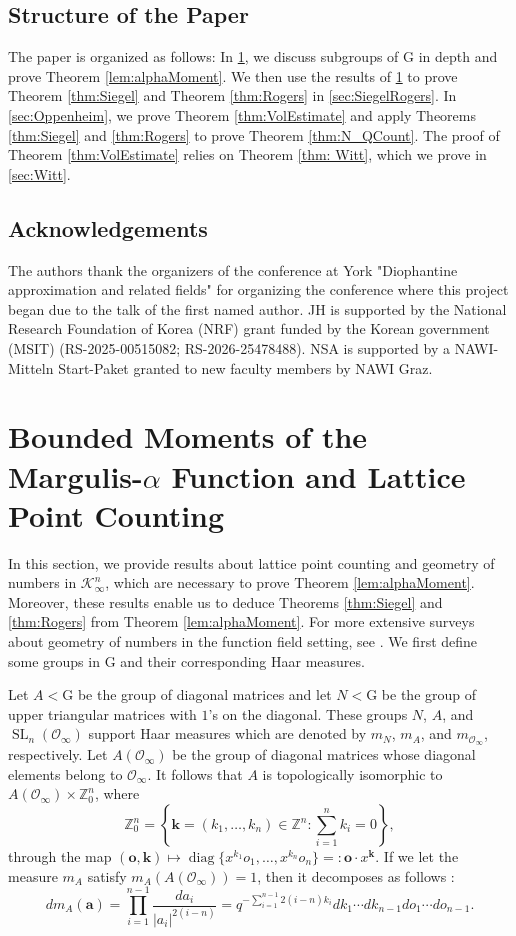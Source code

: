 \documentclass[11pt,a4paper,reqno]{amsart}
\theoremstyle{definition}
\theoremstyle{remark}
\numberwithin{equation}{section}
\begin{document}
\subsection{Structure of the Paper} The paper is organized as follows: In \cref{sec:GON}, we discuss subgroups of $\mathrm{G}$ in depth and prove Theorem \ref{lem:alphaMoment}. We then use the results of \cref{sec:GON} to prove Theorem \ref{thm:Siegel} and Theorem \ref{thm:Rogers} in \cref{sec:SiegelRogers}. In \cref{sec:Oppenheim}, we prove Theorem \ref{thm:VolEstimate} and apply Theorems \ref{thm:Siegel} and \ref{thm:Rogers} to prove Theorem \ref{thm:N_QCount}. The proof of Theorem \ref{thm:VolEstimate} relies on Theorem \ref{thm: Witt}, which we prove in \cref{sec:Witt}. 
\subsection{Acknowledgements}
The authors thank the organizers of the conference at York "Diophantine approximation and related fields" for organizing the conference where this project began due to the talk of the first named author. JH is supported by the National Research Foundation of Korea (NRF) grant funded by the Korean government (MSIT) (RS-2025-00515082; RS-2026-25478488). NSA is supported by a NAWI-Mitteln Start-Paket granted to new faculty members by NAWI Graz. 
\section{Bounded Moments of the Margulis-$\alpha$ Function and Lattice Point Counting}
\label{sec:GON}
In this section, we provide results about lattice point counting and geometry of numbers in $\mathcal{K}_{\infty}^n$, which are necessary to prove Theorem \ref{lem:alphaMoment}. Moreover, these results enable us to deduce Theorems \ref{thm:Siegel} and \ref{thm:Rogers} from Theorem \ref{lem:alphaMoment}. For more extensive surveys about geometry of numbers in the function field setting, see \cite{Mah,BT,Weil,RW,KST,A}. We first define some groups in $\mathrm{G}$ and their corresponding Haar measures.

Let $A<\mathrm{G}$ be the group of diagonal matrices and let $N<\mathrm{G}$ be the group of upper triangular matrices with $1$'s on the diagonal. These groups $N$, $A$, and $\operatorname{SL}_n(\mathcal{O}_{\infty})$ support Haar measures which are denoted by $m_N$, $m_A$, and $m_{\mathcal{O}_{\infty}}$, respectively. Let $A(\mathcal{O}_{\infty})$ be the group of diagonal matrices whose diagonal elements belong to $\mathcal{O}_{\infty}$. It follows that $A$ is topologically isomorphic to $A(\mathcal{O}_{\infty})\times \mathbb{Z}_0^n$, where 
$$\mathbb{Z}_0^n=\left\{\mathbf k=(k_1,\dots,k_n)\in \mathbb{Z}^n:\sum_{i=1}^nk_i=0\right\},$$
through the map $(\mathbf{o},\mathbf{k})\mapsto \operatorname{diag}\{x^{k_1}o_1,\dots,x^{k_n}o_n\}=:\mathbf{o}\cdot x^{\mathbf{k}}$.
If we let the measure $m_A$ satisfy $m_A(A(\mathcal{O}_{\infty}))=1$, then it decomposes as follows \cite{Casselman}:
\begin{equation}\label{eqn:AmeaDecomp}
dm_A(\mathbf{a})=\prod_{i=1}^{n-1}\frac{da_i}{\vert a_i\vert^{2(i-n)}}=q^{-\sum_{i=1}^{n-1}2(i-n)k_i}dk_1\cdots dk_{n-1}do_1\cdots do_{n-1}.
\end{equation}
\end{document}
